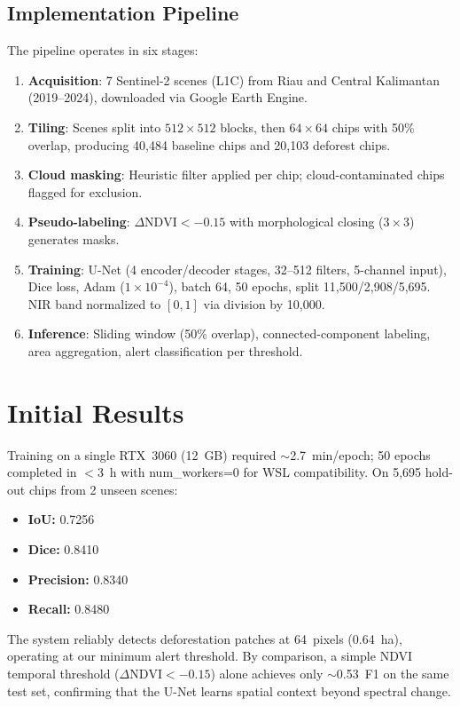 \documentclass[10pt,a4paper,onecolumn]{article}
\begin{document}
\subsection{Implementation Pipeline}
The pipeline operates in six stages:
\begin{enumerate}[nosep,itemsep=1pt]
    \item \textbf{Acquisition}: 7 Sentinel-2 scenes (L1C) from
          Riau and Central Kalimantan (2019--2024), downloaded
          via Google Earth Engine.
    \item \textbf{Tiling}: Scenes split into $512\times512$ blocks,
          then $64\times64$ chips with 50\% overlap, producing
          40,484 baseline chips and 20,103 deforest chips.
    \item \textbf{Cloud masking}: Heuristic filter applied per
          chip; cloud-contaminated chips flagged for exclusion.
    \item \textbf{Pseudo-labeling}: $\Delta\text{NDVI}<-0.15$ with
          morphological closing ($3\times3$) generates masks.
    \item \textbf{Training}: U-Net (4 encoder/decoder stages,
          32--512 filters, 5-channel input), Dice loss, Adam
          ($1\times10^{-4}$), batch 64, 50 epochs, split
          11,500/2,908/5,695. NIR band normalized to $[0,1]$
          via division by 10,000.
    \item \textbf{Inference}: Sliding window (50\% overlap),
          connected-component labeling, area aggregation, alert
          classification per threshold.
\end{enumerate}

\section{Initial Results}
Training on a single RTX~3060 (12~GB) required $\sim$2.7~min/epoch;
50 epochs completed in ${<}$3~h with num\_workers=0 for WSL
compatibility. On 5,695 hold-out chips from 2 unseen scenes:
\begin{itemize}[nosep]
    \item \textbf{IoU:} 0.7256
    \item \textbf{Dice:} 0.8410
    \item \textbf{Precision:} 0.8340
    \item \textbf{Recall:} 0.8480
\end{itemize}
The system reliably detects deforestation patches at 64~pixels
(0.64~ha), operating at our minimum alert threshold. By comparison,
a simple NDVI temporal threshold ($\Delta\text{NDVI}<-0.15$) alone
achieves only $\sim$0.53~F1 on the same test set, confirming that
the U-Net learns spatial context beyond spectral change.
\end{document}
